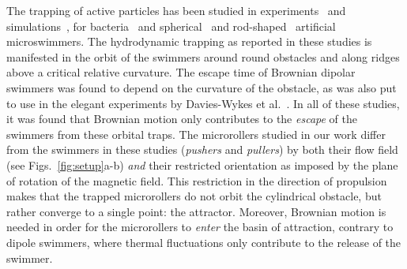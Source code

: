 \documentclass[12pt]{article}
\begin{document}
The trapping of active particles has been studied in experiments~\cite{takagi2014hydrodynamic,simmchen2016topographical,wykes2017guiding,sipos2015hydrodynamic,ketzetzi2022activity} and simulations~\cite{spagnolie2015geometric,sharifi2017dynamics}, for bacteria~\cite{sipos2015hydrodynamic,Tahaka2022} and spherical~\cite{takagi2014hydrodynamic,simmchen2016topographical,spagnolie2015geometric,sharifi2017dynamics,ketzetzi2022activity,ketzetzi2022activity} and rod-shaped~\cite{takagi2014hydrodynamic,wykes2017guiding,spagnolie2015geometric} artificial microswimmers. 
The hydrodynamic trapping as reported in these studies is manifested in the orbit of the swimmers around round obstacles and along ridges above a critical relative curvature. 
The escape time of Brownian dipolar swimmers was found to depend on the curvature of the obstacle, as was also put to use in the elegant experiments by Davies-Wykes et al.~\cite{wykes2017guiding}. 
In all of these studies, it was found that Brownian motion only contributes to the \textit{escape} of the swimmers from these orbital traps.
The microrollers studied in our work differ from the swimmers in these studies (\textit{pushers} and \textit{pullers}) by both their flow field~\cite{delmotte2017minimal,kos2018elementary} (see Figs.~\ref{fig:setup}a-b) \textit{and} their restricted orientation as imposed by the plane of rotation of the magnetic field. 
This restriction in the direction of propulsion makes that the trapped microrollers do not orbit the cylindrical obstacle, but rather converge to a single point: the attractor. Moreover, Brownian motion is needed in order for the microrollers to \textit{enter} the basin of attraction, contrary to dipole swimmers, where thermal fluctuations only contribute to the release of the swimmer.

\end{document}
